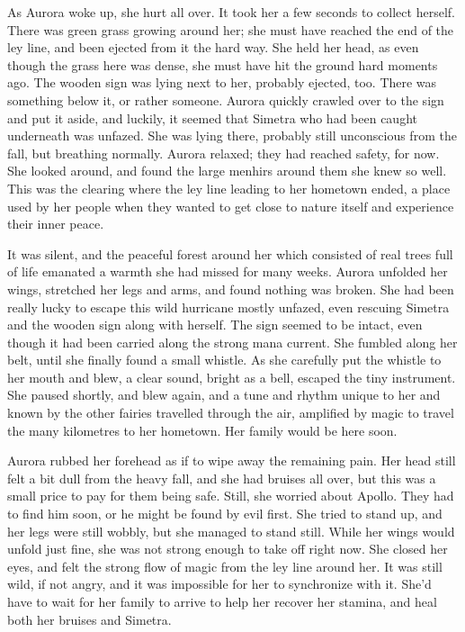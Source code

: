 \fancybreaker{}

As Aurora woke up, she hurt all over. It took her a few seconds to collect herself. There was green grass growing around her; she must have reached the end of the ley line, and been ejected from it the hard way. She held her head, as even though the grass here was dense, she must have hit the ground hard moments ago. The wooden sign was lying next to her, probably ejected, too. There was something below it, or rather someone. Aurora quickly crawled over to the sign and put it aside, and luckily, it seemed that Simetra who had been caught underneath was unfazed. She was lying there, probably still unconscious from the fall, but breathing normally. Aurora relaxed; they had reached safety, for now. She looked around, and found the large menhirs around them she knew so well. This was the clearing where the ley line leading to her hometown ended, a place used by her people when they wanted to get close to nature itself and experience their inner peace.

It was silent, and the peaceful forest around her which consisted of real trees full of life emanated a warmth she had missed for many weeks. Aurora unfolded her wings, stretched her legs and arms, and found nothing was broken. She had been really lucky to escape this wild hurricane mostly unfazed, even rescuing Simetra and the wooden sign along with herself. The sign seemed to be intact, even though it had been carried along the strong mana current. She fumbled along her belt, until she finally found a small whistle. As she carefully put the whistle to her mouth and blew, a clear sound, bright as a bell, escaped the tiny instrument. She paused shortly, and blew again, and a tune and rhythm unique to her and known by the other fairies travelled through the air, amplified by magic to travel the many kilometres to her hometown. Her family would be here soon.

Aurora rubbed her forehead as if to wipe away the remaining pain. Her head still felt a bit dull from the heavy fall, and she had bruises all over, but this was a small price to pay for them being safe. Still, she worried about Apollo. They had to find him soon, or he might be found by evil first. She tried to stand up, and her legs were still wobbly, but she managed to stand still. While her wings would unfold just fine, she was not strong enough to take off right now. She closed her eyes, and felt the strong flow of magic from the ley line around her. It was still wild, if not angry, and it was impossible for her to synchronize with it. She'd have to wait for her family to arrive to help her recover her stamina, and heal both her bruises and Simetra.

